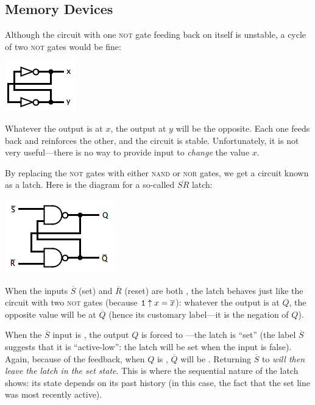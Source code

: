 \subsection{Memory Devices}
Although the circuit with one \textsc{not} gate feeding back on itself is unstable, a cycle of two \textsc{not} gates would be fine:
\begin{center}
\includegraphics[width=!,height=!,scale=0.75]{graphics/NotLatch.png}
\end{center}
Whatever the output is at $x$, the output at $y$ will be the opposite. Each one feeds back and reinforces the other, and the circuit is stable. Unfortunately, it is not very useful---there is no way to provide input to \emph{change} the value $x$.

By replacing the \textsc{not} gates with either \textsc{nand} or \textsc{nor} gates, we get a circuit known as a latch. Here is the diagram for a so-called $\overline{SR}$ latch:
\begin{center}
\includegraphics[width=!,height=!,scale=0.75]{graphics/SRLatch.png}
\end{center}
When the inputs $\overline{S}$ (set) and $\overline{R}$ (reset) are both \1, the latch behaves just like the circuit with two \textsc{not} gates (because $\mathtt{1}\uparrow x=\overline{x}$): whatever the output is at $Q$, the opposite value will be at $\overline{Q}$ (hence its customary label---it is the negation of $Q$).

When the $\overline{S}$ input is \0, the output $Q$ is forced to \1---the latch is ``set'' (the label $\overline{S}$ suggests that it is ``active-low'': the latch will be set when the input is false). Again, because of the feedback, when $Q$ is \1, $\overline{Q}$ will be \0. Returning $\overline{S}$ to \1 \emph{will then leave the latch in the set state}. This is where the sequential nature of the latch shows: its state depends on its past history (in this case, the fact that the set line was most recently active).

